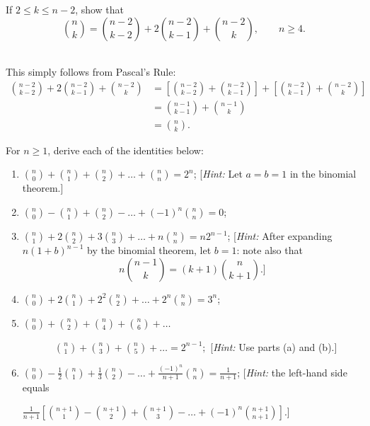 \begin{exercise}
    If $2\leq k \leq n - 2$, show that
    $$\binom{n}{k} = \binom{n-2}{k-2} + 2\binom{n - 2}{k-1} + \binom{n-2}{k}, \qquad n \geq 4.$$
\end{exercise}

\begin{solution}
    \\ This simply follows from Pascal's Rule:
    \begin{align*}
        \binom{n-2}{k-2} + 2\binom{n - 2}{k-1} + \binom{n-2}{k} &= \left[\binom{n-2}{k-2} + \binom{n - 2}{k-1}\right] + \left[\binom{n - 2}{k-1} + \binom{n-2}{k}\right] \\
        &= \binom{n-1}{k-1} + \binom{n-1}{k} \\
        &= \binom{n}{k}.
    \end{align*}
\end{solution}

\begin{exercise}
    For $n \geq 1$, derive each of the identities below:
    \begin{enumerate}
        \item $\displaystyle \binom{n}{0} + \binom{n }{1} + \binom{n }{2} + \dots + \binom{n }{n } = 2^n$;
        [\textit{Hint:} Let $a = b = 1$ in the binomial theorem.]
        \item $\displaystyle \binom{n}{0} - \binom{n }{1} + \binom{n }{2} - \dots + (-1)^n\binom{n }{n } = 0$;
        \item $\displaystyle \binom{n}{1} + 2\binom{n }{2} + 3\binom{n }{3} + \dots + n\binom{n }{n } = n2^{n-1}$;
        [\textit{Hint:} After expanding $n(1 + b)^{n-1}$ by the binomial theorem, let $b = 1$: note also that
        $$n \binom{n-1}{k } = (k+1)\binom{n }{k+1}.]$$
        \item $\displaystyle \binom{n}{0} + 2\binom{n }{1} + 2^2\binom{n }{2} + \dots + 2^n\binom{n }{n } = 3^n$;
        \item $\displaystyle \binom{n}{0} + \binom{n }{2} + \binom{n }{4} + \binom{n }{6 } + \dots$
        
        $\displaystyle \qquad \quad \ \binom{n}{1} + \binom{n }{3} + \binom{n }{5} + \dots = 2^{n-1};$
        [\textit{Hint:} Use parts (a) and (b).]
        \item $\displaystyle \binom{n}{0} - \frac{1}{2}\binom{n }{1} + \frac{1}{3}\binom{n }{2} - \dots + \frac{(-1)^n}{n+1}\binom{n }{n } = \frac{1}{n+1}$;
        [\textit{Hint:} the left-hand side equals
        
        $ \displaystyle \frac{1}{n+1} \left[\binom{n+1}{1} - \binom{n+1}{2} + \binom{n+1}{3} - \dots + (-1)^n\binom{n+1}{n+1}\right]$.]
    \end{enumerate}
\end{exercise}

